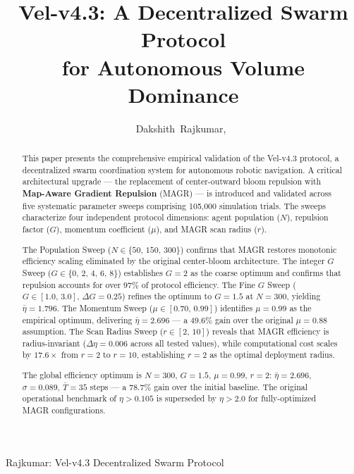 \documentclass[journal,compsoc]{IEEEtran}
\begin{document}
\title{Vel-v4.3: A Decentralized Swarm Protocol\\for Autonomous Volume Dominance}

\author{Dakshith~Rajkumar,~%
}

%
{Rajkumar: Vel-v4.3 Decentralized Swarm Protocol}

\maketitle

\begin{abstract}
This paper presents the comprehensive empirical validation of the Vel-v4.3 protocol,
a decentralized swarm coordination system for autonomous robotic navigation. A critical
architectural upgrade --- the replacement of center-outward bloom repulsion with
\textbf{Map-Aware Gradient Repulsion} (MAGR) --- is introduced and validated across
five systematic parameter sweeps comprising 105{,}000 simulation trials. The sweeps
characterize four independent protocol dimensions: agent population ($N$), repulsion
factor ($G$), momentum coefficient ($\mu$), and MAGR scan radius ($r$).

The Population Sweep ($N \in \{50,\,150,\,300\}$) confirms that MAGR restores monotonic
efficiency scaling eliminated by the original center-bloom architecture. The integer $G$
Sweep ($G \in \{0,\,2,\,4,\,6,\,8\}$) establishes $G=2$ as the coarse optimum and
confirms that repulsion accounts for over $97\%$ of protocol efficiency. The Fine $G$
Sweep ($G \in [1.0,\,3.0]$, $\Delta G=0.25$) refines the optimum to $G=1.5$ at $N=300$,
yielding $\bar{\eta}=1.796$. The Momentum Sweep ($\mu \in [0.70,\,0.99]$) identifies
$\mu=0.99$ as the empirical optimum, delivering $\bar{\eta}=2.696$ --- a $49.6\%$ gain
over the original $\mu=0.88$ assumption. The Scan Radius Sweep ($r \in [2,\,10]$) reveals
that MAGR efficiency is radius-invariant ($\Delta\eta=0.006$ across all tested values),
while computational cost scales by $17.6\times$ from $r=2$ to $r=10$, establishing $r=2$
as the optimal deployment radius.

The global efficiency optimum is $N=300$, $G=1.5$, $\mu=0.99$, $r=2$:
$\bar{\eta}=2.696$, $\sigma=0.089$, $\bar{T}=35$ steps --- a $78.7\%$ gain over the
initial baseline. The original operational benchmark of $\eta>0.105$ is superseded by
$\eta>2.0$ for fully-optimized MAGR configurations.
\end{abstract}
\end{document}
